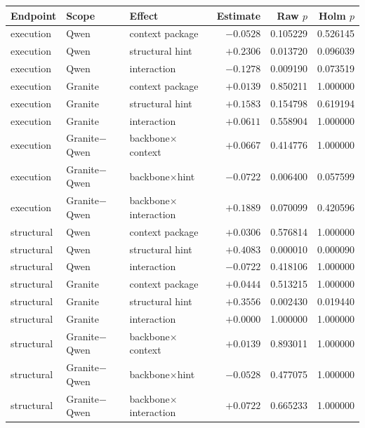 \begin{tabular}{lllrrr}
\toprule
Endpoint & Scope & Effect & Estimate & Raw $p$ & Holm $p$ \\
\midrule
execution & Qwen & context package & $-0.0528$ & 0.105229 & 0.526145 \\
execution & Qwen & structural hint & $+0.2306$ & 0.013720 & 0.096039 \\
execution & Qwen & interaction & $-0.1278$ & 0.009190 & 0.073519 \\
execution & Granite & context package & $+0.0139$ & 0.850211 & 1.000000 \\
execution & Granite & structural hint & $+0.1583$ & 0.154798 & 0.619194 \\
execution & Granite & interaction & $+0.0611$ & 0.558904 & 1.000000 \\
execution & Granite$-$Qwen & backbone$\times$context & $+0.0667$ & 0.414776 & 1.000000 \\
execution & Granite$-$Qwen & backbone$\times$hint & $-0.0722$ & 0.006400 & 0.057599 \\
execution & Granite$-$Qwen & backbone$\times$interaction & $+0.1889$ & 0.070099 & 0.420596 \\
\midrule
structural & Qwen & context package & $+0.0306$ & 0.576814 & 1.000000 \\
structural & Qwen & structural hint & $+0.4083$ & 0.000010 & 0.000090 \\
structural & Qwen & interaction & $-0.0722$ & 0.418106 & 1.000000 \\
structural & Granite & context package & $+0.0444$ & 0.513215 & 1.000000 \\
structural & Granite & structural hint & $+0.3556$ & 0.002430 & 0.019440 \\
structural & Granite & interaction & $+0.0000$ & 1.000000 & 1.000000 \\
structural & Granite$-$Qwen & backbone$\times$context & $+0.0139$ & 0.893011 & 1.000000 \\
structural & Granite$-$Qwen & backbone$\times$hint & $-0.0528$ & 0.477075 & 1.000000 \\
structural & Granite$-$Qwen & backbone$\times$interaction & $+0.0722$ & 0.665233 & 1.000000 \\
\bottomrule
\end{tabular}
